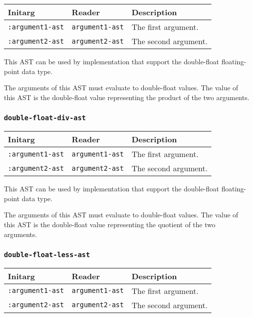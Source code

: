 \begin{tabular}{|l|l|l|}
\hline
Initarg & Reader & Description\\
\hline\hline
\texttt{:argument1-ast} & \texttt{argument1-ast} & The first argument.\\
\hline
\texttt{:argument2-ast} & \texttt{argument2-ast} & The second argument.\\
\hline
\end{tabular}

This AST can be used by implementation that support the double-float
floating-point data type.  

The arguments of this AST must evaluate to double-float
values.  The value of this AST is the double-float value
representing the product of the two arguments.

\subsubsection{\texttt{double-float-div-ast}}
\label{sec-ast-double-float-div}

\begin{tabular}{|l|l|l|}
\hline
Initarg & Reader & Description\\
\hline\hline
\texttt{:argument1-ast} & \texttt{argument1-ast} & The first argument.\\
\hline
\texttt{:argument2-ast} & \texttt{argument2-ast} & The second argument.\\
\hline
\end{tabular}

This AST can be used by implementation that support the double-float
floating-point data type.  

The arguments of this AST must evaluate to double-float
values.  The value of this AST is the double-float value
representing the quotient of the two arguments.

\subsubsection{\texttt{double-float-less-ast}}
\label{sec-ast-double-float-less}

\begin{tabular}{|l|l|l|}
\hline
Initarg & Reader & Description\\
\hline\hline
\texttt{:argument1-ast} & \texttt{argument1-ast} & The first argument.\\
\hline
\texttt{:argument2-ast} & \texttt{argument2-ast} & The second argument.\\
\hline
\end{tabular}

